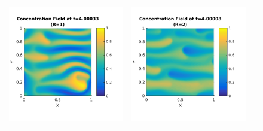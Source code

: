 \documentclass{article}
\begin{document}
\begin{enumerate}
\clearpage

\begin{figure}[!ht]
\centering
\begin{tabular}{c c c}
\includegraphics[scale=0.5]{conc10_400.png} &
\includegraphics[scale=0.5]{conc20_400.png} &

\end{tabular}
\end{figure}
\end{enumerate}
\end{document}
